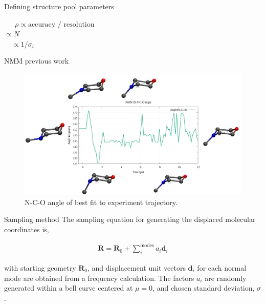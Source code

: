 \documentclass{beamer}
\begin{document}
\begin{frame}{Defining structure pool parameters}
		\begin{center}
	\qquad\qquad\qquad\ \ \ {\huge$\rho\propto\textrm{accuracy / resolution}$}\\
		\vspace{2mm}
	{\huge$\propto N$}\\
		\vspace{2mm}
	\quad\ \ {\huge$\propto 1/\sigma_i$}\\

		\end{center}

\end{frame}

\begin{frame}{NMM previous work}
	\begin{figure}[H]
	\centering
		\includegraphics[width=\textwidth]{geomovie_ppt_slide.png}
		\caption{N-C-O angle of best fit to experiment trajectory.}
		\label{fig:geomovie-ppt-slide}
	\end{figure}
	
\end{frame}


\begin{frame}{Sampling method}
The sampling equation for generating the displaced molecular coordinates is,

\begin{eqnarray}
\textbf{R} = \textbf{R}_0 + \sum_i^{\textrm{modes}} a_i\textbf{d}_i
\end{eqnarray}

with starting geometry $\textbf{R}_0$, and displacement unit vectors $\textbf{d}_i$ for each normal mode are obtained from a frequency calculation.  The factors $a_i$ are randomly generated within a bell curve centered at $\mu=0$, and chosen standard deviation, $\sigma$. 
\end{frame}
\end{document}
